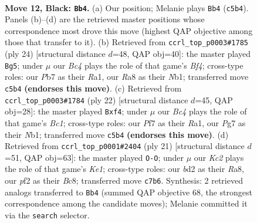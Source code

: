 \documentclass[11pt]{article}
\begin{document}
\clearpage

\begin{figure}[p]\centering
\begin{subfigure}{0.46\textwidth}\centering
\resizebox{\linewidth}{!}{%
\newchessgame
\chessboard[
  setfen={rnb1r3/1pk2ppp/4pn2/p1b5/P6P/1B2PN2/1P1B1PP1/RN3RK1 b - - 2 12},
  showmover=false,
  pgfstyle=straightmove, color=movearrow, markmove={c5-b4}
]}
\caption{}
\end{subfigure}\hfill
\begin{subfigure}{0.46\textwidth}\centering
\resizebox{\linewidth}{!}{%
\newchessgame
\chessboard[
  setfen={r1b1k1r1/ppp1bp1p/2np1n2/8/3P1B1P/2P5/PP3NP1/RN2KB1R w KQq - 1 13},
  showmover=false,
  pgfstyle=straightmove, color=movearrow, markmove={f4-g5}
]}
\caption{}
\end{subfigure}
\\[4pt]
\begin{subfigure}{0.46\textwidth}\centering
\resizebox{\linewidth}{!}{%
\newchessgame
\chessboard[
  setfen={r1bnk1nr/ppp1bp1p/3p4/8/3P1p1P/2P5/PP3NP1/RNB1KB1R w KQkq - 1 12},
  showmover=false,
  pgfstyle=straightmove, color=movearrow, markmove={c1-f4}
]}
\caption{}
\end{subfigure}\hfill
\begin{subfigure}{0.46\textwidth}\centering
\resizebox{\linewidth}{!}{%
\newchessgame
\chessboard[
  setfen={r1b1k2r/1p2bppp/p1n1pn2/8/1PB5/P3PN2/3N1PPP/R1BR2K1 b kq - 2 11},
  showmover=false,
  pgfstyle=straightmove, color=movearrow, markmove={e8-g8}
]}
\caption{}
\end{subfigure}
\caption{\textbf{Move 12, Black: \texttt{Bb4}.} (a) Our position; Melanie plays \texttt{Bb4} (\texttt{c5b4}). Panels (b)--(d) are the retrieved master positions whose correspondence most drove this move (highest QAP objective among those that transfer to it). (b) Retrieved from \texttt{ccrl\_top\_p0003\#1785} (ply 24) [structural distance $d$=48, QAP obj=40]: the master played \texttt{Bg5}; under $\mu$ our \emph{Bc4} plays the role of that game's \emph{Bf4}; cross-type roles: our \emph{P}b7 as their \emph{R}a1, our \emph{R}a8 as their \emph{N}b1; transferred move \texttt{c5b4} \textbf{(endorses this move)}. (c) Retrieved from \texttt{ccrl\_top\_p0003\#1784} (ply 22) [structural distance $d$=45, QAP obj=28]: the master played \texttt{Bxf4}; under $\mu$ our \emph{Bc4} plays the role of that game's \emph{Bc1}; cross-type roles: our \emph{P}f7 as their \emph{R}a1, our \emph{P}g7 as their \emph{N}b1; transferred move \texttt{c5b4} \textbf{(endorses this move)}. (d) Retrieved from \texttt{ccrl\_top\_p0001\#2404} (ply 21) [structural distance $d$=51, QAP obj=63]: the master played \texttt{O-O}; under $\mu$ our \emph{Kc2} plays the role of that game's \emph{Ke1}; cross-type roles: our \emph{b}d2 as their \emph{R}a8, our \emph{p}f2 as their \emph{B}c8; transferred move \texttt{c7b6}. Synthesis: 2 retrieved analogs transferred to \texttt{Bb4} (summed QAP objective 68, the strongest correspondence among the candidate moves); Melanie committed it via the \texttt{search} selector.}
\label{fig:thought-m23}
\end{figure}
\end{document}
